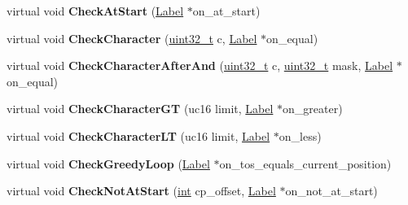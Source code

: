 \begin{DoxyCompactItemize}
virtual void {\bfseries Check\+At\+Start} (\mbox{\hyperlink{classv8_1_1internal_1_1Label}{Label}} $\ast$on\+\_\+at\+\_\+start)
\item 
\mbox{\label{classv8_1_1internal_1_1RegExpMacroAssemblerIA32_a1ea0f2090e1722ce7f1ce4b4e64c5576}} 
virtual void {\bfseries Check\+Character} (\mbox{\hyperlink{classuint32__t}{uint32\+\_\+t}} c, \mbox{\hyperlink{classv8_1_1internal_1_1Label}{Label}} $\ast$on\+\_\+equal)
\item 
\mbox{\label{classv8_1_1internal_1_1RegExpMacroAssemblerIA32_a8e0d52d1ad8b9cd6fe8f0d08f54296ef}} 
virtual void {\bfseries Check\+Character\+After\+And} (\mbox{\hyperlink{classuint32__t}{uint32\+\_\+t}} c, \mbox{\hyperlink{classuint32__t}{uint32\+\_\+t}} mask, \mbox{\hyperlink{classv8_1_1internal_1_1Label}{Label}} $\ast$on\+\_\+equal)
\item 
\mbox{\label{classv8_1_1internal_1_1RegExpMacroAssemblerIA32_a5d0bf70cd682a67b96495d9b73f65c9b}} 
virtual void {\bfseries Check\+Character\+GT} (uc16 limit, \mbox{\hyperlink{classv8_1_1internal_1_1Label}{Label}} $\ast$on\+\_\+greater)
\item 
\mbox{\label{classv8_1_1internal_1_1RegExpMacroAssemblerIA32_a3c7cf5235c8933272896a9e1272a8483}} 
virtual void {\bfseries Check\+Character\+LT} (uc16 limit, \mbox{\hyperlink{classv8_1_1internal_1_1Label}{Label}} $\ast$on\+\_\+less)
\item 
\mbox{\label{classv8_1_1internal_1_1RegExpMacroAssemblerIA32_a9442c1ac4106d7a2c710981e8e5b234d}} 
virtual void {\bfseries Check\+Greedy\+Loop} (\mbox{\hyperlink{classv8_1_1internal_1_1Label}{Label}} $\ast$on\+\_\+tos\+\_\+equals\+\_\+current\+\_\+position)
\item 
\mbox{\label{classv8_1_1internal_1_1RegExpMacroAssemblerIA32_aa47e9c48f838a20512915262c0264746}} 
virtual void {\bfseries Check\+Not\+At\+Start} (\mbox{\hyperlink{classint}{int}} cp\+\_\+offset, \mbox{\hyperlink{classv8_1_1internal_1_1Label}{Label}} $\ast$on\+\_\+not\+\_\+at\+\_\+start)
\item 

\end{DoxyCompactItemize}
